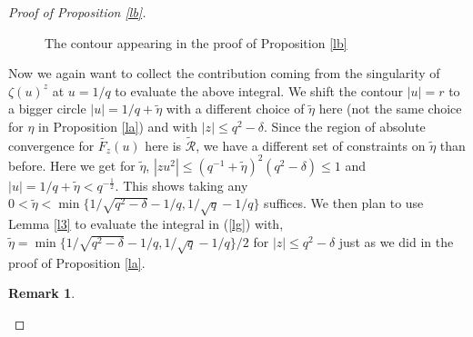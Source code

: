 \documentclass[12pt]{amsart}
\numberwithin{equation}{section}
\newtheorem{remark}[theorem]{Remark}
\theoremstyle{remark}
\theoremstyle{remark}
\theoremstyle{definition}
\begin{document}
\begin{proof}[Proof of Proposition \ref{lb}]
\begin{figure}[h]
    \caption{The contour appearing in the proof of Proposition \ref{lb}}
    \label{Ax}
\end{figure}
Now we again want to collect the contribution coming from the singularity of $\zeta(u)^z$ at $u=1/q$ to evaluate the above integral. We shift the contour $|u|=r$ to a bigger circle $|u|=1/q+\widetilde{\eta}$ with a different choice of $\widetilde{\eta}$ here (not the same choice for $\eta$ in Proposition \ref{la}) and with $|z|\leqslant q^2-\delta$. Since the region of absolute convergence for $\widetilde{F_z}(u)$ here is $\widetilde{\mathcal{R}}$, we have a different set of constraints on $\widetilde{\eta}$ than before. Here we get for $\widetilde{\eta}$, $|zu^2|\leqslant (q^{-1}+\widetilde{\eta})^2(q^2-\delta)\leqslant 1$ and $|u|=1/q+\widetilde{\eta}<q^{-\frac{1}{2}}$. This shows taking any $0<\widetilde{\eta} <\min\{1/\sqrt{q^2-\delta}-1/q,1/\sqrt{q}-1/q \}$ suffices. We then plan to use Lemma \ref{l3} to evaluate the integral in (\ref{lg}) with, $\widetilde{\eta}=\min\{1/\sqrt{q^2-\delta}-1/q,1/\sqrt{q}-1/q \}/2$ for $|z|\leqslant q^2-\delta$ just as we did in the proof of Proposition \ref{la}. \\
\begin{remark}

\end{remark}
\end{proof}
\end{document}
